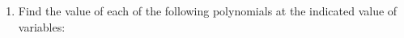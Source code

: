 \renewcommand{\theequation}{\theenumi}
\begin{enumerate}[label=\arabic*.,ref=\thesubsection.\theenumi]
\item Find the value of each of the following polynomials at the indicated value of variables: 
\end{enumerate}
